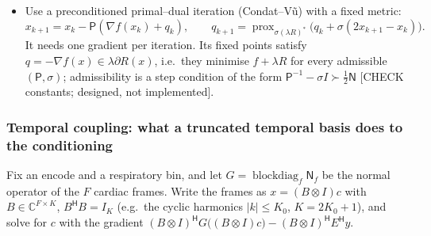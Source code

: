 \documentclass[11pt]{article}
\theoremstyle{remark}
\newcommand{\Nop}{\mathsf N}
\newcommand{\herm}{\mathsf H}
\newcommand{\CC}{\mathbb C}
\begin{document}
\begin{itemize}
\begin{itemize}
    \item[(b)] Use a preconditioned primal--dual iteration (Condat--V\~u) with a fixed metric:
    \[
      x_{k+1}=x_k-\mathsf P(\nabla f(x_k)+q_k),\qquad q_{k+1}=\operatorname{prox}_{\sigma(\lambda R)^*}\bigl(q_k+\sigma(2x_{k+1}-x_k)\bigr).
    \]
    It needs one gradient per iteration. Its fixed points satisfy $q=-\nabla f(x)\in\lambda\partial R(x)$, i.e.\ they minimise $f+\lambda R$ for every admissible $(\mathsf P,\sigma)$; admissibility is a step condition of the form $\mathsf P^{-1}-\sigma I\succ\tfrac12\Nop$ [CHECK constants; designed, not implemented].
  \end{itemize}
\end{itemize}

\subsubsection*{Temporal coupling: what a truncated temporal basis does to the conditioning}
Fix an encode and a respiratory bin, and let $G=\operatorname{blockdiag}_f\Nop_f$ be the normal operator of the $F$ cardiac frames. Write the frames as $x=(B\otimes I)c$ with $B\in\CC^{F\times K}$, $B^\herm B=I_K$ (e.g.\ the cyclic harmonics $|k|\le K_0$, $K=2K_0+1$), and solve for $c$ with the gradient $(B\otimes I)^\herm G\bigl((B\otimes I)c\bigr)-(B\otimes I)^\herm E^\herm y$.
\end{document}
